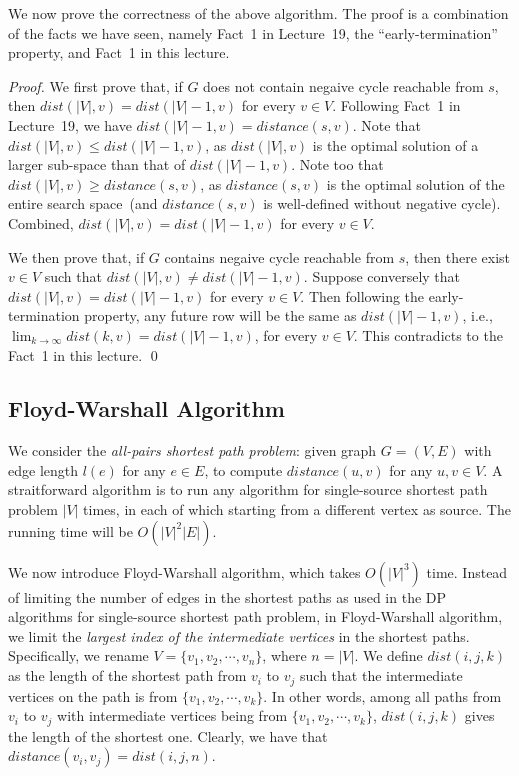 We now prove the correctness of the above algorithm.
The proof is a combination of the facts we have seen, namely Fact~1 in Lecture~19, the ``early-termination'' property,
and Fact~1 in this lecture.

\emph{Proof.} We first prove that, if $G$ does not contain negaive cycle reachable from $s$, then $dist(|V|, v) = dist(|V| - 1, v)$ for every $v\in V$.
Following Fact~1 in Lecture~19, we have $dist(|V| - 1, v) = distance(s,v)$.
Note that $dist(|V|, v) \le dist(|V| - 1, v)$, as $dist(|V|,v)$ is the optimal solution of a larger sub-space than that of $dist(|V|-1,v)$.
Note too that $dist(|V|,v) \ge distance(s,v)$, as $distance(s,v)$ is the optimal solution of the entire search space~(and
$distance(s,v)$ is well-defined without negative cycle).
Combined, $dist(|V|, v) = dist(|V| - 1, v)$ for every $v\in V$.

We then prove that, if $G$ contains negaive cycle reachable from $s$, then there exist $v\in V$ such that $dist(|V|, v) \neq dist(|V| - 1, v)$.
Suppose conversely that $dist(|V|, v) = dist(|V| - 1, v)$ for every $v\in V$.
Then following the early-termination property, any future row will be the same as $dist(|V|-1,v)$, i.e., $\lim_{k\to\infty} dist(k, v) = dist(|V| - 1, v)$, for every $v\in V$.
This contradicts to the Fact~1 in this lecture. \qed

\subsection*{Floyd-Warshall Algorithm}

We consider the \emph{all-pairs shortest path problem}: given graph $G = (V, E)$ with edge length $l(e)$ for any $e\in E$,
to compute $distance(u,v)$ for any $u,v\in V$. A straitforward algorithm is to run any algorithm for single-source shortest path problem
$|V|$ times, in each of which starting from a different vertex as source. The running time will be $O(|V|^2|E|)$.

We now introduce Floyd-Warshall algorithm, which takes $O(|V|^3)$ time.
Instead of limiting the number of edges in the shortest paths as used in the DP algorithms for single-source shortest path problem,
in Floyd-Warshall algorithm, we limit the \emph{largest index of the intermediate vertices} in the shortest paths.
Specifically, we rename $V = \{v_1, v_2, \cdots, v_n\}$, where $n = |V|$.
We define $dist(i,j,k)$ as the length of the shortest path from $v_i$ to $v_j$
such that the intermediate vertices on the path is from $\{v_1, v_2, \cdots, v_k\}$.
In other words, among all paths from $v_i$ to $v_j$ with 
intermediate vertices being from $\{v_1, v_2, \cdots, v_k\}$,
$dist(i,j,k)$ gives the length of the shortest one.
Clearly, we have that $distance(v_i, v_j) = dist(i, j, n)$.

